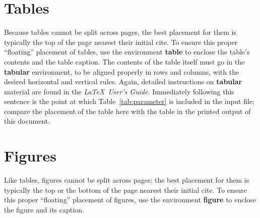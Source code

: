 \documentclass{jiveArticle}
\begin{document}
\section{Tables}
Because tables cannot be split across pages, the best
placement for them is typically the top of the page
nearest their initial cite.  To
ensure this proper ``floating'' placement of tables, use the
environment \textbf{table} to enclose the table's contents and
the table caption. The contents of the table itself must go
in the \textbf{tabular} environment, to
be aligned properly in rows and columns, with the desired
horizontal and vertical rules.  Again, detailed instructions
on \textbf{tabular} material
are found in the \textit{\LaTeX\ User's Guide}. Immediately following this sentence is the point at which
Table~\ref{tab:parameter} is included in the input file; compare the
placement of the table here with the table in the printed
output of this document.

\begin{table}
	\label{tab:parameter}%
\end{table}

\section{Figures}

Like tables, figures cannot be split across pages; the best placement
for them is typically the top or the bottom of the page nearest their initial cite.  To ensure this proper ``floating'' placement of figures, use the environment \textbf{figure} to enclose the figure and its caption.
\end{document}
